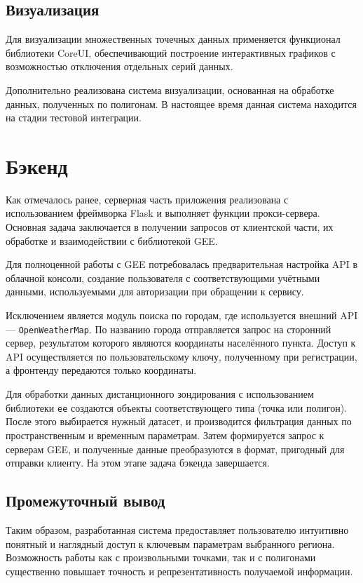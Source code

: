\subsection*{Визуализация}

Для визуализации множественных точечных данных применяется функционал библиотеки CoreUI, обеспечивающий построение интерактивных графиков с возможностью отключения отдельных серий данных.

Дополнительно реализована система визуализации, основанная на обработке данных, полученных по полигонам. В настоящее время данная система находится на стадии тестовой интеграции.

\section{Бэкенд}

Как отмечалось ранее, серверная часть приложения реализована с использованием фреймворка Flask и выполняет функции прокси-сервера. Основная задача заключается в получении запросов от клиентской части, их обработке и взаимодействии с библиотекой GEE\cite{GoogleEarthEngine2023}.

Для полноценной работы с GEE потребовалась предварительная настройка API в облачной консоли, создание пользователя с соответствующими учётными данными, используемыми для авторизации при обращении к сервису.

Исключением является модуль поиска по городам, где используется внешний API — \texttt{OpenWeatherMap}. По названию города отправляется запрос на сторонний сервер, результатом которого являются координаты населённого пункта. Доступ к API осуществляется по пользовательскому ключу, полученному при регистрации, а фронтенду передаются только координаты.

Для обработки данных дистанционного зондирования с использованием библиотеки \texttt{ee} создаются объекты соответствующего типа (точка или полигон). После этого выбирается нужный датасет, и производится фильтрация данных по пространственным и временным параметрам. Затем формируется запрос к серверам GEE, и полученные данные преобразуются в формат, пригодный для отправки клиенту. На этом этапе задача бэкенда завершается.

\subsection*{Промежуточный вывод}

Таким образом, разработанная система предоставляет пользователю интуитивно понятный и наглядный доступ к ключевым параметрам выбранного региона. Возможность работы как с произвольными точками, так и с полигонами существенно повышает точность и репрезентативность получаемой информации.
